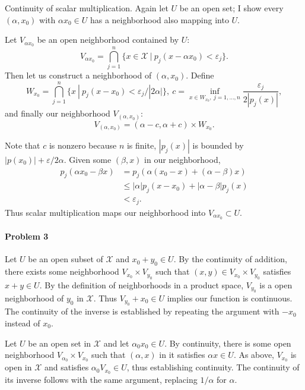 \documentclass[12pt]{article}
\newcommand{\X}{\mathcal{X}}
\begin{document}
Continuity of scalar multiplication. Again let $U$ be an open set; I show every
$(\alpha, x_0)$ with $\alpha x_0\in U$ has a neighborhood also mapping into $U$.

Let $V_{\alpha x_0}$ be an open neighborhood contained by $U$:
\begin{displaymath}
  V_{\alpha x_0} = \bigcap_{j=1}^n \{x\in\X\ |\ p_j(x-\alpha x_0) < \varepsilon_j\}.
\end{displaymath}
Then let us construct a neighborhood of $(\alpha, x_0)$. Define
\begin{displaymath}
  W_{x_0} = \bigcap_{j=1}^n\{x\ |\ p_j(x-x_0) < \varepsilon_j/|2\alpha|\},\ 
  c = \inf_{x\in W_{x_0},\ j = 1,\ldots ,n} \frac{\varepsilon_j}{2|p_j(x)|},
\end{displaymath}
and finally our neighborhood $V_{(\alpha, x_0)}$:
\begin{displaymath}
  V_{(\alpha, x_0)} = (\alpha - c, \alpha + c)\times W_{x_0}.
\end{displaymath}

Note that $c$ is nonzero because $n$ is finite, $|p_j(x)|$ is bounded by
$|p(x_0)| + \varepsilon/2\alpha$. Given some $(\beta, x)$ in our neighborhood,
\begin{align*}
  p_j(\alpha x_0 - \beta x)
  & = p_j(\alpha(x_0-x) + (\alpha - \beta)x)\\
  & \leq |\alpha|p_j(x-x_0) + |\alpha -\beta|p_j(x)\\
  & < \varepsilon_j.
\end{align*}
Thus scalar multiplication maps our neighborhood into $V_{\alpha x_0}\subset U$.

\paragraph{Problem 3}

Let $U$ be an open subset of $\X$ and $x_0+y_0 \in U$. By the continuity of
addition, there exists some neighborhood $V_{x_0}\times V_{y_0}$ such that
$(x,y)\in V_{x_0}\times V_{y_0}$ satisfies $x + y \in U$. By the definition of
neighborhoods in a product space, $V_{y_0}$ is a open neighborhood of $y_0$
in $\X$. Thus $V_{y_0} + x_0 \in U$ implies our function is continuous.
The continuity of the inverse is established by repeating the argument with
$-x_0$ instead of $x_0$.

Let $U$ be an open set in $\X$ and let $\alpha_0 x_0 \in U$. By continuity, there
is some open neighborhood $V_{\alpha_0}\times V_{x_0}$ such that $(\alpha,x)$ in
it satisfies $\alpha x \in U$. As above, $V_{x_0}$ is open in $\X$ and satisfies
$\alpha_0V_{x_0} \in U$, thus establishing continuity. The continuity of its
inverse follows with the same argument, replacing $1/\alpha$ for $\alpha$.
\end{document}
